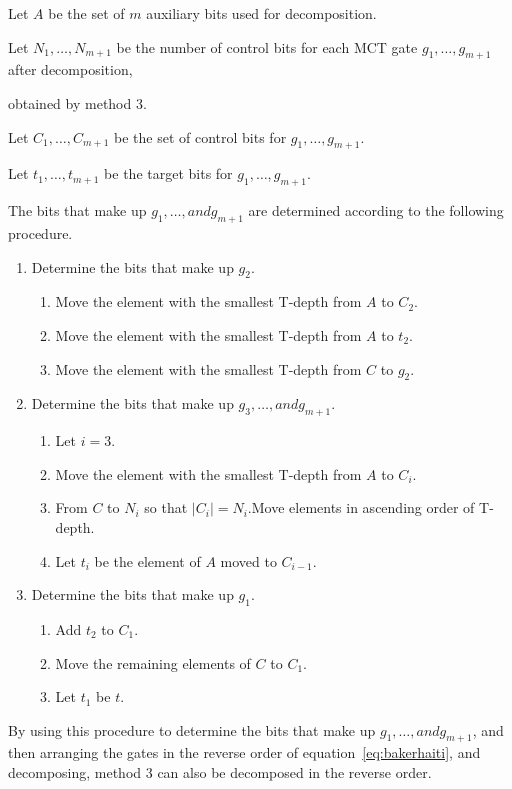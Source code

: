 Let $A$ be the set of $m$ auxiliary bits used for decomposition.

Let $N_{1}, \dots, N_{m+1}$ be the number of control bits for each MCT gate $g_{1}, \dots, g_{m+1}$ after decomposition,

obtained by method 3.

Let $C_{1}, \dots, C_{m+1}$ be the set of control bits for $g_{1}, \dots, g_{m+1}$.

Let $t_{1}, \dots, t_{m+1}$ be the target bits for $g_{1}, \dots, g_{m+1}$.

The bits that make up $g_{1},\dots, and g_{m+1}$ are determined according to the following procedure.
\begin{enumerate}[Step 1]
\item Determine the bits that make up $g_{2}$.
\begin{enumerate}
\item Move the element with the smallest T-depth from $A$ to $C_{2}$.
\item Move the element with the smallest T-depth from $A$ to $t_{2}$.
\item Move the element with the smallest T-depth from $C$ to $g_{2}$.
\end{enumerate}
\item Determine the bits that make up $g_{3},\dots, and g_{m+1}$.
\begin{enumerate}
\item Let $i=3$.
\item Move the element with the smallest T-depth from $A$ to $C_{i}$.
\item From $C$ to $N_{i}$ so that $|C_{i}|=N_{i}$.Move elements in ascending order of T-depth.
\item Let $t_{i}$ be the element of $A$ moved to $C_{i-1}$.
\end{enumerate}
\item Determine the bits that make up $g_{1}$.
\begin{enumerate}
\item Add $t_{2}$ to $C_{1}$.
\item Move the remaining elements of $C$ to $C_{1}$.
\item Let $t_{1}$ be $t$.
\end{enumerate}
\end{enumerate}
By using this procedure to determine the bits that make up $g_{1},\dots, and g_{m+1}$, and then arranging the gates in the reverse order of equation~\ref{eq:bakerhaiti},
and decomposing, method 3 can also be decomposed in the reverse order.

